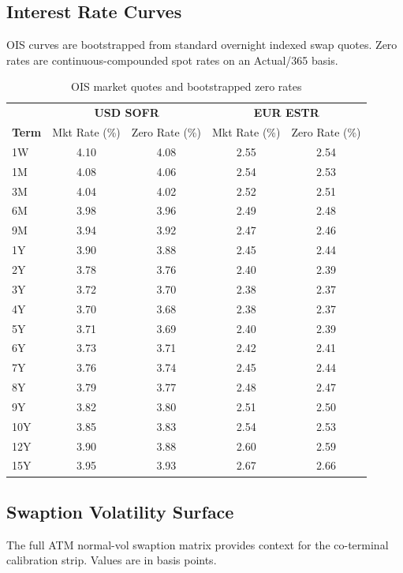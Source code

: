 \documentclass[conference]{IEEEtran}
\begin{document}
\subsection{Interest Rate Curves}

OIS curves are bootstrapped from standard overnight indexed swap quotes. Zero rates are continuous-compounded spot rates on an Actual/365 basis.

\begin{table}[!t]
\centering
\begin{tabular}{l|cc|cc}
\toprule
& \multicolumn{2}{c|}{\textbf{USD SOFR}} & \multicolumn{2}{c}{\textbf{EUR ESTR}} \\
\textbf{Term} & Mkt Rate (\%) & Zero Rate (\%) & Mkt Rate (\%) & Zero Rate (\%) \\
\midrule
1W & 4.10 & 4.08 & 2.55 & 2.54 \\
1M & 4.08 & 4.06 & 2.54 & 2.53 \\
3M & 4.04 & 4.02 & 2.52 & 2.51 \\
6M & 3.98 & 3.96 & 2.49 & 2.48 \\
9M & 3.94 & 3.92 & 2.47 & 2.46 \\
1Y & 3.90 & 3.88 & 2.45 & 2.44 \\
2Y & 3.78 & 3.76 & 2.40 & 2.39 \\
3Y & 3.72 & 3.70 & 2.38 & 2.37 \\
4Y & 3.70 & 3.68 & 2.38 & 2.37 \\
5Y & 3.71 & 3.69 & 2.40 & 2.39 \\
6Y & 3.73 & 3.71 & 2.42 & 2.41 \\
7Y & 3.76 & 3.74 & 2.45 & 2.44 \\
8Y & 3.79 & 3.77 & 2.48 & 2.47 \\
9Y & 3.82 & 3.80 & 2.51 & 2.50 \\
10Y & 3.85 & 3.83 & 2.54 & 2.53 \\
12Y & 3.90 & 3.88 & 2.60 & 2.59 \\
15Y & 3.95 & 3.93 & 2.67 & 2.66 \\
\bottomrule
\end{tabular}
\caption{OIS market quotes and bootstrapped zero rates}
\end{table}

\subsection{Swaption Volatility Surface}

The full ATM normal-vol swaption matrix provides context for the co-terminal calibration strip. Values are in basis points.
\end{document}
